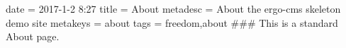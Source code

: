 date = 2017-1-2 8:27
title = About
metadesc = About the ergo-cms skeleton demo site
metakeys = about
tags = freedom,about
###
This is a standard About page. 